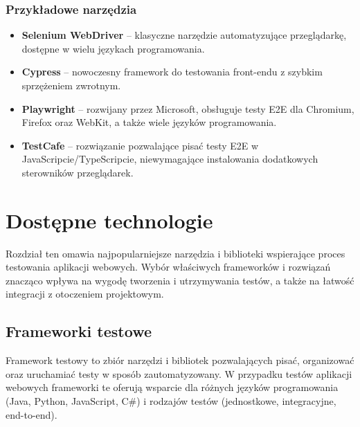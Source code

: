 \documentclass[12pt]{report}
\begin{document}
\subsection*{Przykładowe narzędzia}
\begin{itemize}
    \item \textbf{Selenium WebDriver} -- klasyczne narzędzie automatyzujące przeglądarkę, dostępne w wielu językach programowania.
    \item \textbf{Cypress} -- nowoczesny framework do testowania front-endu z szybkim sprzężeniem zwrotnym.
    \item \textbf{Playwright} -- rozwijany przez Microsoft, obsługuje testy E2E dla Chromium, Firefox oraz WebKit, a także wiele języków programowania.
    \item \textbf{TestCafe} -- rozwiązanie pozwalające pisać testy E2E w JavaScripcie/TypeScripcie, niewymagające instalowania dodatkowych sterowników przeglądarek.
\end{itemize}

\chapter{Dostępne technologie}
Rozdział ten omawia najpopularniejsze narzędzia i biblioteki wspierające proces testowania aplikacji webowych. Wybór właściwych frameworków i rozwiązań znacząco wpływa na wygodę tworzenia i utrzymywania testów, a także na łatwość integracji z otoczeniem projektowym.

\section{Frameworki testowe}
Framework testowy to zbiór narzędzi i bibliotek pozwalających pisać, organizować oraz uruchamiać testy w sposób zautomatyzowany. W przypadku testów aplikacji webowych frameworki te oferują wsparcie dla różnych języków programowania (Java, Python, JavaScript, C\#) i rodzajów testów (jednostkowe, integracyjne, end-to-end).
\end{document}
